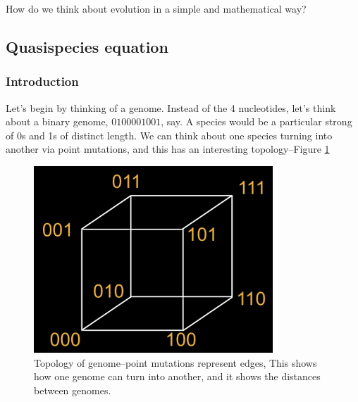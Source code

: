 \documentclass[]{article}
\begin{document}
How do we think about evolution in a simple and mathematical way?

\subsection{Quasispecies equation}

\subsubsection{Introduction}
Let's begin by thinking of a genome. Instead of the 4 nucleotides, let's think about a binary genome, $0100001001$, say. A species would be a particular strong of 0s and 1s of distinct length. We can think about one species turning into another via point mutations, and this has an interesting topology--Figure \ref{fig:GenomeTopology}


\begin{figure}[H]
	\begin{center}
		\caption[Topology of genome]{Topology of genome--point mutations represent edges, This shows how one genome can turn into another, and it shows the distances between genomes.}\label{fig:GenomeTopology} 
		\includegraphics[width=0.8\textwidth]{GenomeTopology}
	\end{center}
\end{figure}
\end{document}
